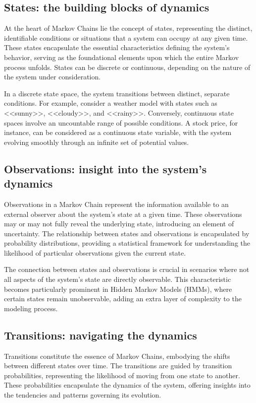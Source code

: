 \documentclass{englishreport}
\begin{document}
\subsection{States: the building blocks of dynamics}

At the heart of Markov Chains lie the concept of states, representing the distinct, identifiable conditions or situations that a system can occupy at any given time. These states encapsulate the essential characteristics defining the system's behavior, serving as the foundational elements upon which the entire Markov process unfolds. States can be discrete or continuous, depending on the nature of the system under consideration.

In a discrete state space, the system transitions between distinct, separate conditions. For example, consider a weather model with states such as <<sunny>>, <<cloudy>>, and <<rainy>>. Conversely, continuous state spaces involve an uncountable range of possible conditions. A stock price, for instance, can be considered as a continuous state variable, with the system evolving smoothly through an infinite set of potential values. 

\subsection{Observations: insight into the system's dynamics}

Observations in a Markov Chain represent the information available to an external observer about the system's state at a given time. These observations may or may not fully reveal the underlying state, introducing an element of uncertainty. The relationship between states and observations is encapsulated by probability distributions, providing a statistical framework for understanding the likelihood of particular observations given the current state.

The connection between states and observations is crucial in scenarios where not all aspects of the system's state are directly observable. This characteristic becomes particularly prominent in Hidden Markov Models (HMMs), where certain states remain unobservable, adding an extra layer of complexity to the modeling process.

\subsection{Transitions: navigating the dynamics}

Transitions constitute the essence of Markov Chains, embodying the shifts between different states over time. The transitions are guided by transition probabilities, representing the likelihood of moving from one state to another. These probabilities encapsulate the dynamics of the system, offering insights into the tendencies and patterns governing its evolution.
\end{document}
